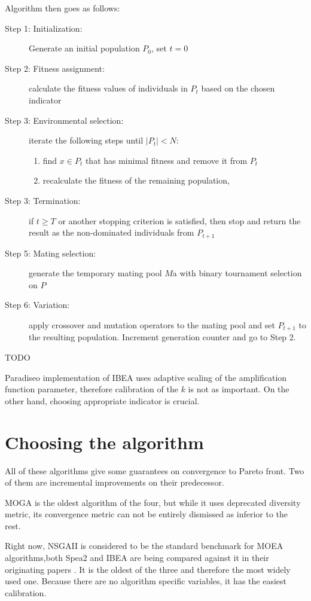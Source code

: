 \documentclass[12pt,oneside]{fithesis2}
\begin{document}
Algorithm then goes as follows:
\begin{description}
	\item[Step 1: Initialization:] Generate an initial population $P_0$, set $t=0$
	\item[Step 2: Fitness assignment:] calculate the fitness values of individuals in $P_t$ based on the chosen indicator
	\item[Step 3: Environmental selection:] iterate the following steps until $|P_t|< N$: 
       \begin{enumerate}
        \item find $x \in P_t$ that has minimal fitness and remove it from $P_t$
        \item recalculate the fitness of the remaining population, 
       \end{enumerate}
	\item[Step 3: Termination:] if $t \geq T$ or another stopping criterion is satisfied, then stop and return the result as the non-dominated individuals from $P_{t+1}$
	\item[Step 5: Mating selection:] generate the temporary mating pool $M$a with binary tournament selection on $P$
	\item[Step 6: Variation:] apply crossover and mutation operators to the mating pool and set $P_{t+1}$ to the resulting population. Increment generation counter and go to Step 2.
\end{description}

TODO

Paradiseo implementation of IBEA uses adaptive scaling of the amplification function parameter, therefore calibration of the $k$ is not as important. On the other hand, choosing appropriate indicator is crucial.


\section{Choosing the algorithm}
All of these algorithms give some guarantees on convergence to Pareto front. Two of them are incremental improvements on their predecessor. 

MOGA is the oldest algorithm of the four, but while it uses deprecated diversity metric, its convergence metric can not be entirely dismissed as inferior to the rest.

Right now, NSGAII is considered to be the standard benchmark for MOEA algorithms,both Spea2 and IBEA are being compared against it in their originating papers . It is the oldest of the three and therefore the most widely used one. Because there are no algorithm specific variables, it has the easiest calibration.
       
\end{document}
